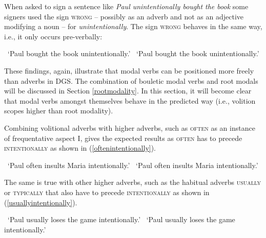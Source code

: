 When asked to sign a sentence like \textit{Paul unintentionally bought the book} some signers used the sign \textsc{wrong} -- possibly as an adverb and not as an adjective modifying a noun -- for \textit{unintentionally}. The sign \textsc{wrong} behaves in the same way, i.e., it only occurs pre-verbally:

\begin{exe}
\ex\begin{xlist} 
\glt \textcolor{white}{*}`Paul bought the book unintentionally.' \label{ex:xintentionallya}
\glt \textcolor{white}{*}`Paul bought the book unintentionally.'  \label{ex:xintentionallyb}
\end{xlist}
\end{exe} 

\noindent These findings, again, illustrate that modal verbs can be positioned more freely than adverbs in DGS. The combination of bouletic modal verbs and root modals will be discussed in Section \ref{rootmodality}. In this section, it will become clear that modal verbs amongst themselves behave in the predicted way (i.e., volition scopes higher than root modality). 

Combining volitional adverbs with higher adverbs, such as \textsc{often} as an instance of frequentative aspect I, gives the expected results as \textsc{often} has to precede \textsc{intentionally} as shown in (\ref{oftenintentionally}). 

\begin{exe}
\ex\label{oftenintentionally}\begin{xlist} 
\glt \textcolor{white}{*}`Paul often insults Maria intentionally.' \label{ex:oftenintentionallya}
\glt \textcolor{white}{*}`Paul often insults Maria intentionally.'  \label{ex:oftenintentionallyb}
\end{xlist}
\end{exe} 

\noindent The same is true with other higher adverbs, such as the habitual adverbs \textsc{usually} or \textsc{typically} that also have to precede \textsc{intentionally} as shown in (\ref{usuallyintentionally}).

\begin{exe}
\ex\label{usuallyintentionally}\begin{xlist} 
\glt \textcolor{white}{*}`Paul usually loses the game intentionally.' \label{ex:usuallyintentionallya}
\glt \textcolor{white}{*}`Paul usually loses the game intentionally.'  \label{ex:usuallyintentionallyb}
\end{xlist}
\end{exe} 

